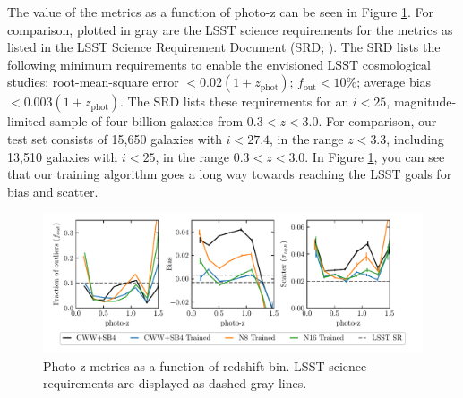 The value of the metrics as a function of photo-z can be seen in Figure \ref{fig:photoz_binned}. For comparison, plotted in gray are the LSST science requirements for the metrics as listed in the LSST Science Requirement Document (SRD; \citealt{Ivezic2018}).
The SRD lists the following minimum requirements to enable the envisioned LSST cosmological studies: root-mean-square error $< 0.02(1+z_\text{phot})$; $f_\text{out} < 10\%$; average bias $<0.003(1+z_\text{phot})$.
The SRD lists these requirements for an $i<25$, magnitude-limited sample of four billion galaxies from $0.3 < z < 3.0$.
For comparison, our test set consists of 15,650 galaxies with $i < 27.4$, in the range $z < 3.3$, including 13,510 galaxies with $i < 25$, in the range $0.3 < z < 3.0$.
In Figure \ref{fig:photoz_binned}, you can see that our training algorithm goes a long way towards reaching the LSST goals for bias and scatter.

\begin{figure}
    \centering
    \includegraphics{figures/photoz_binned_metrics.pdf}
    \caption{Photo-z metrics as a function of redshift bin. LSST science requirements are displayed as dashed gray lines.}
    \label{fig:photoz_binned}
\end{figure}